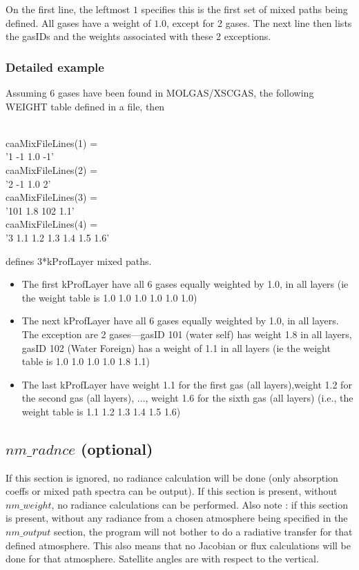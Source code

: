 \documentclass[12pt]{article}
\newcommand{\ttab}{\indent\indent}
\begin{document}
{\smallskip
On the first line, the leftmost $1$ specifies this is the first set
of mixed paths being defined.  All gases have a weight of $1.0$,
except for 2 gases.  The next line then lists the gasIDs and the
weights associated with these 2 exceptions.

\subsubsection{Detailed example}

Assuming 6 gases have been found in MOLGAS/XSCGAS, the following WEIGHT 
table defined in a file, then

\medskip
{\sf
\ttab 3\\
caaMixFileLines(1) = \\
\ttab '1 -1 1.0 -1'\\
caaMixFileLines(2) = \\
\ttab '2 -1 1.0  2'\\
caaMixFileLines(3) = \\
\ttab \indent   '101 1.8 102  1.1'\\
caaMixFileLines(4) = \\
\ttab '3 1.1 1.2 1.3 1.4 1.5 1.6'
}

\medskip
\noindent defines 3*kProfLayer mixed paths.

\begin{itemize}
\item The first kProfLayer have all 6 gases equally weighted by 1.0, in all
  layers (ie the weight table is 1.0 1.0 1.0 1.0 1.0 1.0)
\item The next kProfLayer have all 6 gases equally weighted by 1.0, in all
  layers.  The exception are 2 gases---gasID 101 (water self) has weight 
  1.8 in all layers, gasID 102 (Water Foreign) has a weight of 1.1 in 
  all layers (ie the weight table is 1.0 1.0 1.0 1.0 1.8 1.1)
\item The last kProfLayer have weight 1.1 for the first gas (all
  layers),weight 1.2 for the second gas (all layers), ..., weight
  1.6 for the sixth gas (all layers) (i.e., the weight table is 1.1 1.2
  1.3 1.4 1.5 1.6)
\end{itemize}

\subsection{$nm\_radnce$ (optional)}

If this section is ignored, no radiance calculation will be done (only
absorption coeffs or mixed path spectra can be output).  If this section is 
present, without $nm\_weight$, no radiance calculations can be performed.  
Also note : if this
section is present, without any radiance from a chosen atmosphere
being specified in the $nm\_output$ section, the program will not bother to
do a radiative transfer for that defined atmosphere.  This also means
that no Jacobian or flux calculations will be done for that atmosphere.
Satellite angles are with respect to the vertical.

}
\end{document}

